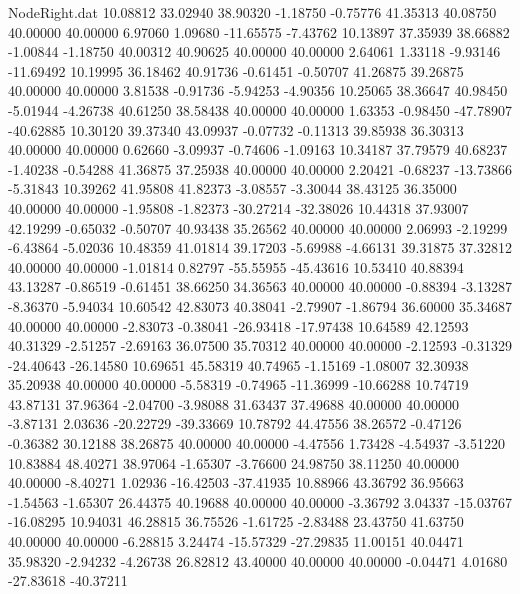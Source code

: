 \begin{filecontents}{NodeRight.dat}
  10.08812   33.02940   38.90320    -1.18750   -0.75776   41.35313   40.08750   40.00000   40.00000    6.97060    1.09680  -11.65575   -7.43762
  10.13897   37.35939   38.66882    -1.00844   -1.18750   40.00312   40.90625   40.00000   40.00000    2.64061    1.33118   -9.93146  -11.69492
  10.19995   36.18462   40.91736    -0.61451   -0.50707   41.26875   39.26875   40.00000   40.00000    3.81538   -0.91736   -5.94253   -4.90356
  10.25065   38.36647   40.98450    -5.01944   -4.26738   40.61250   38.58438   40.00000   40.00000    1.63353   -0.98450  -47.78907  -40.62885
  10.30120   39.37340   43.09937    -0.07732   -0.11313   39.85938   36.30313   40.00000   40.00000    0.62660   -3.09937   -0.74606   -1.09163
  10.34187   37.79579   40.68237    -1.40238   -0.54288   41.36875   37.25938   40.00000   40.00000    2.20421   -0.68237  -13.73866   -5.31843
  10.39262   41.95808   41.82373    -3.08557   -3.30044   38.43125   36.35000   40.00000   40.00000   -1.95808   -1.82373  -30.27214  -32.38026
  10.44318   37.93007   42.19299    -0.65032   -0.50707   40.93438   35.26562   40.00000   40.00000    2.06993   -2.19299   -6.43864   -5.02036
  10.48359   41.01814   39.17203    -5.69988   -4.66131   39.31875   37.32812   40.00000   40.00000   -1.01814    0.82797  -55.55955  -45.43616
  10.53410   40.88394   43.13287    -0.86519   -0.61451   38.66250   34.36563   40.00000   40.00000   -0.88394   -3.13287   -8.36370   -5.94034
  10.60542   42.83073   40.38041    -2.79907   -1.86794   36.60000   35.34687   40.00000   40.00000   -2.83073   -0.38041  -26.93418  -17.97438
  10.64589   42.12593   40.31329    -2.51257   -2.69163   36.07500   35.70312   40.00000   40.00000   -2.12593   -0.31329  -24.40643  -26.14580
  10.69651   45.58319   40.74965    -1.15169   -1.08007   32.30938   35.20938   40.00000   40.00000   -5.58319   -0.74965  -11.36999  -10.66288
  10.74719   43.87131   37.96364    -2.04700   -3.98088   31.63437   37.49688   40.00000   40.00000   -3.87131    2.03636  -20.22729  -39.33669
  10.78792   44.47556   38.26572    -0.47126   -0.36382   30.12188   38.26875   40.00000   40.00000   -4.47556    1.73428   -4.54937   -3.51220
  10.83884   48.40271   38.97064    -1.65307   -3.76600   24.98750   38.11250   40.00000   40.00000   -8.40271    1.02936  -16.42503  -37.41935
  10.88966   43.36792   36.95663    -1.54563   -1.65307   26.44375   40.19688   40.00000   40.00000   -3.36792    3.04337  -15.03767  -16.08295
  10.94031   46.28815   36.75526    -1.61725   -2.83488   23.43750   41.63750   40.00000   40.00000   -6.28815    3.24474  -15.57329  -27.29835
  11.00151   40.04471   35.98320    -2.94232   -4.26738   26.82812   43.40000   40.00000   40.00000   -0.04471    4.01680  -27.83618  -40.37211

\end{filecontents}
